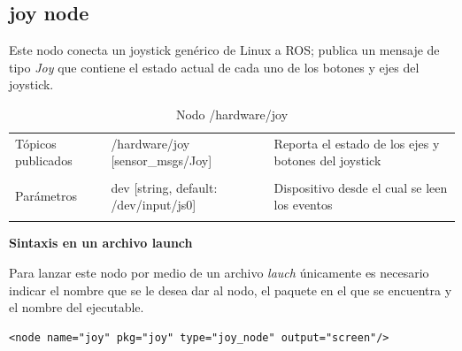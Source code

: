 \documentclass[user_manual.tex]{subfiles}
\begin{document}
\subsection{joy node}

Este nodo conecta un joystick genérico de Linux a ROS; publica un mensaje de tipo \textit{Joy} que contiene el estado actual de cada uno de los botones y ejes del joystick.

\begin{table}[H]
\begin{center}
\begin{tabular}{|l|p{6.5cm}|p{4.5cm}|}%
\hline

Tópicos publicados
& /hardware/joy [sensor\_msgs/Joy] & Reporta el estado de los ejes y botones del joystick \\
& & \\
\hline

Parámetros
&  dev [string, default: /dev/input/js0] & Dispositivo desde el cual se leen los eventos \\
& & \\
\hline

\end{tabular}
\caption{Nodo /hardware/joy}
\label{joy node}
\end{center}
\end{table}

\textbf{Sintaxis en un archivo launch}

Para lanzar este nodo por medio de un archivo \textit{lauch} únicamente es necesario indicar el nombre que se le desea dar al nodo, el paquete en el que se encuentra y el nombre del ejecutable.
\\
\begin{verbatim}
<node name="joy" pkg="joy" type="joy_node" output="screen"/>
\end{verbatim}

 
 
\end{document}
